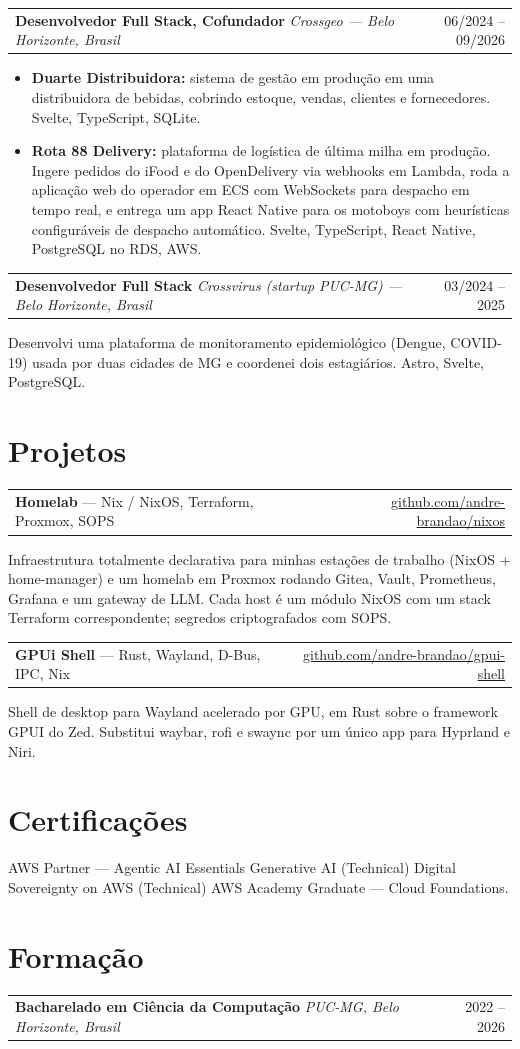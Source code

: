 \documentclass[10pt,a4paper]{article}
\makeatletter
\newcommand{\role}[4]{%
  \par\vspace{1pt}%
  \noindent\begin{tabular*}{\linewidth}[t]{@{}l@{\extracolsep{\fill}}r@{}}
    \textbf{#1} \textit{\textcolor{muted}{#2}} & \textcolor{muted}{#3} \\
  \end{tabular*}\par\nobreak
  \vspace{1pt}#4\par
}
\newcommand{\edu}[3]{%
  \par\vspace{1pt}%
  \noindent\begin{tabular*}{\linewidth}[t]{@{}l@{\extracolsep{\fill}}r@{}}
    \textbf{#1} \textit{\textcolor{muted}{#2}} & \textcolor{muted}{#3} \\
  \end{tabular*}\par
}
\newcommand{\project}[4]{%
  \par\vspace{1pt}%
  \noindent\begin{tabular*}{\linewidth}[t]{@{}l@{\extracolsep{\fill}}r@{}}
    \textbf{#1} \textcolor{muted}{--- #2} & \href{https://#3}{\textcolor{muted}{#3}} \\
  \end{tabular*}\par\nobreak
  #4\par
}
\makeatother
\begin{document}
\role{Desenvolvedor Full Stack, Cofundador}{Crossgeo --- Belo Horizonte, Brasil}{06/2024 -- 09/2026}{
  \begin{itemize}
    \item \textbf{Duarte Distribuidora:} sistema de gestão em produção em uma
          distribuidora de bebidas, cobrindo estoque, vendas, clientes e
          fornecedores. Svelte, TypeScript, SQLite.
    \item \textbf{Rota 88 Delivery:} plataforma de logística de última milha em
          produção. Ingere pedidos do iFood e do OpenDelivery via webhooks em Lambda,
          roda a aplicação web do operador em ECS com WebSockets para despacho
          em tempo real, e entrega um app React Native para os motoboys com
          heurísticas configuráveis de despacho automático.
          Svelte, TypeScript, React Native, PostgreSQL no RDS, AWS.
  \end{itemize}
}
\role{Desenvolvedor Full Stack}{Crossvirus (startup PUC-MG) --- Belo Horizonte, Brasil}{03/2024 -- 2025}{
  Desenvolvi uma plataforma de monitoramento epidemiológico (Dengue, COVID-19)
  usada por duas cidades de MG e coordenei dois estagiários. Astro, Svelte, PostgreSQL.
}

\section*{Projetos}
\project{Homelab}{Nix / NixOS, Terraform, Proxmox, SOPS}{github.com/andre-brandao/nixos}{
  Infraestrutura totalmente declarativa para minhas estações de trabalho (NixOS +
  home-manager) e um homelab em Proxmox rodando Gitea, Vault, Prometheus, Grafana
  e um gateway de LLM. Cada host é um módulo NixOS com um stack Terraform
  correspondente; segredos criptografados com SOPS.
}

\project{GPUi Shell}{Rust, Wayland, D-Bus, IPC, Nix}{github.com/andre-brandao/gpui-shell}{
  Shell de desktop para Wayland acelerado por GPU, em Rust sobre o framework GPUI
  do Zed. Substitui waybar, rofi e swaync por um único app para Hyprland e Niri.
}

\section*{Certificações}
AWS Partner --- Agentic AI Essentials \textbullet{} Generative AI (Technical) \textbullet{}
Digital Sovereignty on AWS (Technical) \textbullet{}
AWS Academy Graduate --- Cloud Foundations.

\section*{Formação}
\edu{Bacharelado em Ciência da Computação}{PUC-MG, Belo Horizonte, Brasil}{2022 -- 2026}
\end{document}

